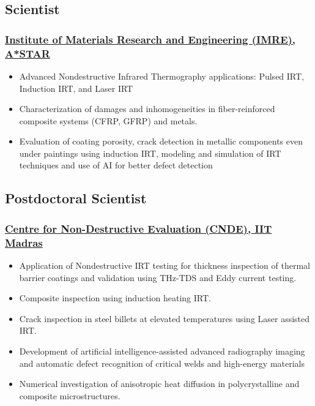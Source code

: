 \documentclass{my_cv}%
\begin{document}
\subsection{Scientist}
\subsubsection{\href{https://www.a-star.edu.sg/imre}{Institute of Materials Research and Engineering (IMRE), A*STAR}}
\begin{itemize}[leftmargin=0.15in]
\setlength\itemsep{-0.1em}
\color{mygray}
\item Advanced Nondestructive Infrared Thermography applications: Pulsed IRT, Induction IRT, and Laser IRT
\item Characterization of damages and inhomogeneities in fiber-reinforced composite systems (CFRP, GFRP) and metals.
\item Evaluation of coating porosity, crack detection in metallic components even under paintings using induction IRT, modeling and simulation of IRT techniques and use of AI for better defect detection 
\end{itemize}%
{\color{mygray1} \hdashrule[0.1ex]{18.8cm}{0.2mm}{1mm}}
\subsection{Postdoctoral Scientist}
\subsubsection{\href{https://www.cnde.in/}{Centre for Non-Destructive Evaluation (CNDE), IIT Madras}}
\begin{itemize}[leftmargin=0.15in]
\setlength\itemsep{-0.1em}
\color{mygray}
\item Application of Nondestructive IRT testing for thickness inspection of thermal barrier coatings and validation using THz-TDS and Eddy current testing.
\item Composite inspection using induction heating IRT.
\item Crack inspection in steel billets at elevated temperatures using Laser assisted IRT.
\item Development of artificial intelligence-assisted advanced radiography imaging and automatic defect recognition of critical welds and high-energy materials
\item Numerical investigation of anisotropic heat diffusion in polycrystalline and composite microstructures.
\end{itemize}%
{\color{mygray1} \hdashrule[0.1ex]{18.8cm}{0.2mm}{1mm}}
\end{document}
